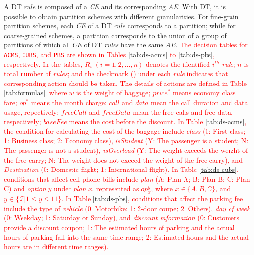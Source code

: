 \documentclass[10pt,journal,compsoc]{IEEEtran}
\begin{document}
A DT \emph{rule} is composed of a \emph{CE} and its corresponding \emph{AE}.
With DT, it is possible to obtain partition schemes with different granularities.
For fine-grain partition schemes, each \emph{CE} of a DT \emph{rule} corresponds to a partition;
while for coarse-grained schemes, a partition corresponds to the union of a group of partitions of which all \emph{CE} of DT \emph{rules} have the same \emph{AE}.
\textcolor{red}{The decision tables for \texttt{ACMS}, \texttt{CUBS}, and \texttt{PBS} are shown in Tables \ref{tab:ds-acms} to \ref{tab:ds-pbs}, respectively. In the tables, $R_i$ $(i = 1, 2, \ldots, n)$ denotes the identified $i^{th}$ \emph{rule}; $n$ is total number of \emph{rules}; and the checkmark (\checkmark) under each \emph{rule} indicates that corresponding action should be taken.
The details of actions are defined in Table \ref{tab:formulas}, where $w$ is the weight of baggage; $price^*$ means economy class fare; $op^*$ means the month charge; $call$ and $data$ mean the call duration and data usage, repectively; $freeCall$ and $freeData$ mean the free calls and free data, respectively; $baseFee$ means the cost before the discount. In Table \ref{tab:ds-acms}, the condition for calculating the cost of the baggage include \emph{class} (0: First class; 1: Business class; 2: Economy class), \emph{isStudent} (Y: The passenger is a student; N: The passenger is not a student), \emph{isOverload} (Y: The weight exceeds the weight of the free carry; N: The weight does not exceed the weight of the free carry), and \emph{Destination} (0: Domestic flight; 1: International flight). In Table \ref{tab:ds-cubs}, conditions that affect cell-phone bills include \emph{plan} (A: Plan A; B: Plan B; C: Plan C) and \emph{option} $y$ under \emph{plan} $x$, represented as $op_x^y$, where $x \in \{A, B, C\}$, and $y \in \{\mathcal{Z} |1 \le y \le 11\}$. In Table \ref{tab:ds-pbs}, conditions that affect the parking fee include the type of \emph{vehicle} (0: Motorbike; 1: 2-door coupe; 2: Others), \emph{day of week} (0: Weekday; 1: Saturday or Sunday), and \emph{discount information} (0: Customers provide a discount coupon; 1: The estimated hours of parking and the actual hours of parking fall into the same time range; 2: Estimated hours and the actual hours are in different time ranges).}
\end{document}
